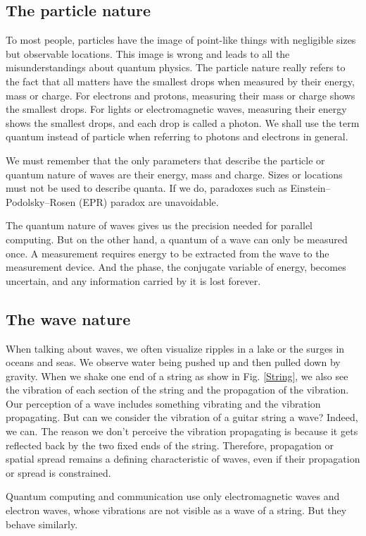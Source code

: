 \subsection{The particle nature}
To most people, particles have the image of point-like things with negligible sizes but observable locations. This image is wrong and leads to all the misunderstandings about quantum physics. The particle nature really refers to the fact that all matters have the smallest drops when measured by their energy, mass or charge. For electrons and protons, measuring their mass or charge shows the smallest drops. For lights or electromagnetic waves, measuring their energy shows the smallest drops, and each drop is called a photon. We shall use the term quantum instead of particle when referring to photons and electrons in general.

We must remember that the only parameters that describe the particle or quantum nature of waves are their energy, mass and charge. Sizes or locations must not be used to describe quanta. If we do, paradoxes such as Einstein–Podolsky–Rosen (EPR) paradox \cite{EPR} are unavoidable.

The quantum nature of waves gives us the precision needed for parallel computing. But on the other hand, a quantum of a wave can only be measured once. A measurement requires energy to be extracted from the wave to the measurement device. And the phase, the conjugate variable of energy, becomes uncertain, and any information carried by it is lost forever.

\subsection{The wave nature}
When talking about waves, we often visualize ripples in a lake or the surges in oceans and seas. We observe water being pushed up and then pulled down by gravity. When we shake one end of a string as show in Fig. \ref{String}, we also see the vibration of each section of the string and the propagation of the vibration. Our perception of a wave includes something vibrating and the vibration propagating. But can we consider the vibration of a guitar string a wave? Indeed, we can. The reason we don't perceive the vibration propagating is because it gets reflected back by the two fixed ends of the string. Therefore, propagation or spatial spread remains a defining characteristic of waves, even if their propagation or spread is constrained.

Quantum computing and communication use only electromagnetic waves and electron waves, whose vibrations are not visible as a wave of a string. But they behave similarly.

